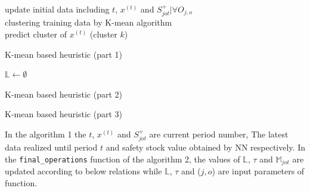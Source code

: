 \documentclass[letterpaper]{article} %
\begin{document}
\begin{algorithm}[t]
\SetAlgoVlined
{}
update initial data including $t$, $x^{(t)}$ and $S_{jot}^{+}|\forall O_{j,o}$\\
clustering training data by K-mean algorithm\\
predict cluster of $x^{(t)}$ (cluster $k$)\\
 \caption{K-mean based heuristic (part 1)}
\end{algorithm}
\begin{algorithm}[t]
\SetAlgoVlined
{}
 $\mathbb{L}\leftarrow\emptyset$\\

 \caption{K-mean based heuristic (part 2)}
\end{algorithm}
\begin{algorithm}[t]
\SetAlgoVlined
{}

 \caption{K-mean based heuristic (part 3)}
\end{algorithm}
In the algorithm 1 the $t$, $x^{(t)}$ and $S_{jot}^{+}$ are current period number, The latest data realized until period $t$ and safety stock value obtained by NN respectively. In the \texttt{final\_operations} function of the algorithm 2, the values of $\mathbb{L}$, $\tau$ and $\mathbb{M}_{jot}$ are updated according to below relations while $\mathbb{L}$, $\tau$ and ($j,o$) are input parameters of function.\\
\end{document}
